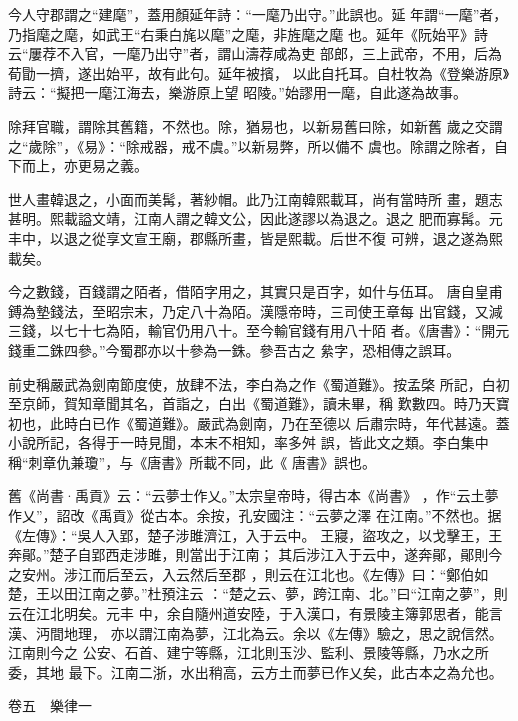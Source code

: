 \documentclass{ctexart}
\begin{document}
今人守郡謂之``建麾''，蓋用顏延年詩：``一麾乃出守。''此誤也。延 年謂``一麾''者，乃指麾之麾，如武王``右秉白旄以麾''之麾，非旌麾之麾 也。延年《阮始平》詩云``屢荐不入官，一麾乃出守''者，謂山濤荐咸為吏 部郎，三上武帝，不用，后為荀勖一擠，遂出始平，故有此句。延年被擯， 以此自托耳。自杜牧為《登樂游原》詩云：``擬把一麾江海去，樂游原上望 昭陵。''始謬用一麾，自此遂為故事。

除拜官職，謂除其舊籍，不然也。除，猶易也，以新易舊曰除，如新舊 歲之交謂之``歲除''，《易》：``除戒器，戒不虞。''以新易弊，所以備不 虞也。除謂之除者，自下而上，亦更易之義。

世人畫韓退之，小面而美髯，著紗帽。此乃江南韓熙載耳，尚有當時所 畫，題志甚明。熙載謚文靖，江南人謂之韓文公，因此遂謬以為退之。退之 肥而寡髯。元丰中，以退之從享文宣王廟，郡縣所畫，皆是熙載。后世不復 可辨，退之遂為熙載矣。

今之數錢，百錢謂之陌者，借陌字用之，其實只是百字，如什与伍耳。 唐自皇甫鎛為墊錢法，至昭宗末，乃定八十為陌。漢隱帝時，三司使王章每 出官錢，又減三錢，以七十七為陌，輸官仍用八十。至今輸官錢有用八十陌 者。《唐書》：``開元錢重二銖四參。''今蜀郡亦以十參為一銖。參吾古之 絫字，恐相傳之誤耳。

前史稱嚴武為劍南節度使，放肆不法，李白為之作《蜀道難》。按孟棨 所記，白初至京師，賀知章聞其名，首詣之，白出《蜀道難》，讀未畢，稱 歎數四。時乃天寶初也，此時白已作《蜀道難》。嚴武為劍南，乃在至德以 后肅宗時，年代甚遠。蓋小說所記，各得于一時見聞，本末不相知，率多舛 誤，皆此文之類。李白集中稱``刺章仇兼瓊''，与《唐書》所載不同，此《 唐書》誤也。

舊《尚書·禹貢》云：``云夢士作乂。''太宗皇帝時，得古本《尚書》 ，作``云土夢作乂''，詔改《禹貢》從古本。余按，孔安國注：``云夢之澤 在江南。''不然也。据《左傳》：``吳人入郢，楚子涉雎濟江，入于云中。 王寢，盜攻之，以戈擊王，王奔鄖。''楚子自郢西走涉雎，則當出于江南； 其后涉江入于云中，遂奔鄖，鄖則今之安州。涉江而后至云，入云然后至郡 ，則云在江北也。《左傳》曰：``鄭伯如楚，王以田江南之夢。''杜預注云 ：``楚之云、夢，跨江南、北。''曰``江南之夢''，則云在江北明矣。元丰 中，余自隨州道安陸，于入漢口，有景陵主簿郭思者，能言漢、沔間地理， 亦以謂江南為夢，江北為云。余以《左傳》驗之，思之說信然。江南則今之 公安、石首、建宁等縣，江北則玉沙、監利、景陵等縣，乃水之所委，其地 最下。江南二浙，水出稍高，云方土而夢已作乂矣，此古本之為允也。

卷五　樂律一
\end{document}
